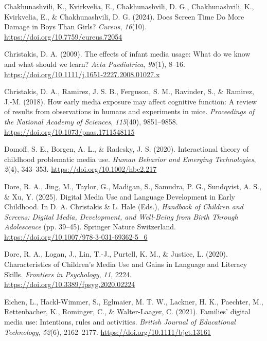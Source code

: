 \documentclass[
  man,
  floatsintext,
  longtable,
  nolmodern,
  notxfonts,
  notimes,
  colorlinks=true,linkcolor=blue,citecolor=blue,urlcolor=blue]{apa7}
\newlength{\cslhangindent}
\newenvironment{CSLReferences}[2] %
 {\begin{list}{}{%
  \setlength{\itemindent}{0pt}
  \setlength{\leftmargin}{0pt}
  \setlength{\parsep}{0pt}
  \ifodd #1
   \setlength{\leftmargin}{\cslhangindent}
   \setlength{\itemindent}{-1\cslhangindent}
  \fi
  \setlength{\itemsep}{#2\baselineskip}}}
 {\end{list}}
\begin{document}
\begin{CSLReferences}{1}{0}
Chakhunashvili, K., Kvirkvelia, E., Chakhunashvili, D. G.,
Chakhunashvili, K., Kvirkvelia, E., \& Chakhunashvili, D. G. (2024).
Does {Screen Time Do More Damage} in {Boys Than Girls}? \emph{Cureus},
\emph{16}(10). \url{https://doi.org/10.7759/cureus.72054}

Christakis, D. A. (2009). The effects of infant media usage: {What} do
we know and what should we learn? \emph{Acta Paediatrica}, \emph{98}(1),
8--16. \url{https://doi.org/10.1111/j.1651-2227.2008.01027.x}

Christakis, D. A., Ramirez, J. S. B., Ferguson, S. M., Ravinder, S., \&
Ramirez, J.-M. (2018). How early media exposure may affect cognitive
function: {A} review of results from observations in humans and
experiments in mice. \emph{Proceedings of the National Academy of
Sciences}, \emph{115}(40), 9851--9858.
\url{https://doi.org/10.1073/pnas.1711548115}

Domoff, S. E., Borgen, A. L., \& Radesky, J. S. (2020). Interactional
theory of childhood problematic media use. \emph{Human Behavior and
Emerging Technologies}, \emph{2}(4), 343--353.
\url{https://doi.org/10.1002/hbe2.217}

Dore, R. A., Jing, M., Taylor, G., Madigan, S., Samudra, P. G.,
Sundqvist, A. S., \& Xu, Y. (2025). Digital {Media Use} and {Language
Development} in {Early Childhood}. In D. A. Christakis \& L. Hale
(Eds.), \emph{Handbook of {Children} and {Screens}: {Digital Media},
{Development}, and {Well-Being} from {Birth Through Adolescence}} (pp.
39--45). Springer Nature Switzerland.
\url{https://doi.org/10.1007/978-3-031-69362-5_6}

Dore, R. A., Logan, J., Lin, T.-J., Purtell, K. M., \& Justice, L.
(2020). Characteristics of {Children}'s {Media Use} and {Gains} in
{Language} and {Literacy Skills}. \emph{Frontiers in Psychology},
\emph{11}, 2224. \url{https://doi.org/10.3389/fpsyg.2020.02224}

Eichen, L., Hackl-Wimmer, S., Eglmaier, M. T. W., Lackner, H. K.,
Paechter, M., Rettenbacher, K., Rominger, C., \& Walter-Laager, C.
(2021). Families' digital media use: {Intentions}, rules and activities.
\emph{British Journal of Educational Technology}, \emph{52}(6),
2162--2177. \url{https://doi.org/10.1111/bjet.13161}


\end{CSLReferences}
\end{document}
